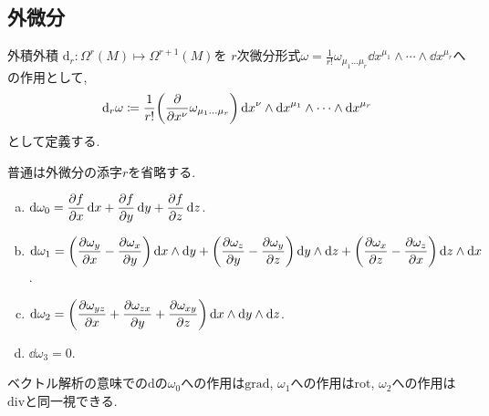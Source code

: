 \documentclass[../main.tex]{subfiles}
\begin{document}
\subsection{外微分}
    \begin{dfn}{外積}{外積}
        $\mathrm{d}_r:\Omega^r(M)\mapsto\Omega^{r+1}(M)$を
        $r$次微分形式$\displaystyle \omega = \frac{1}{r!}\omega_{\mu_1\ldots\mu_r}\dd{x}^{\mu_1} \wedge \cdots \wedge \dd{x}^{\mu_r}$への作用として,
        \begin{equation}
            \mathrm{d}_r\omega \coloneqq \frac{1}{r!}
                \qty(\pdv{x^\nu}\omega_{\mu_1\ldots\mu_r})
                    \dd{x}^\nu \wedge \dd{x}^{\mu_1} \wedge
                        \cdots \wedge \dd{x}^{\mu_r}
        \end{equation}
        として定義する.
    \end{dfn}
    普通は外微分の添字$r$を省略する.

    \begin{exm}{}{}
        \begin{enumerate}[(a)]
            \item $\displaystyle
                \dd{\omega_0}
                    = \pdv{f}{x}\dd{x} + \pdv{f}{y}\dd{y} + \pdv{f}{z}\dd{z}$.
            \item \small $\displaystyle
                \dd{\omega_1}
                    = \qty(\pdv{\omega_y}{x}-\pdv{\omega_x}{y})
                            \dd{x} \wedge \dd{y}
                    + \qty(\pdv{\omega_z}{y}-\pdv{\omega_y}{z})
                            \dd{y} \wedge \dd{z}
                    + \qty(\pdv{\omega_x}{z}-\pdv{\omega_z}{x})
                            \dd{z} \wedge \dd{x}$. \normalsize
            \item $\displaystyle
                \dd{\omega_2}
                    = \qty(\pdv{\omega_{yz}}{x} + \pdv{\omega_{zx}}{y}
                            + \pdv{\omega_{xy}}{z})
                                \dd{x} \wedge \dd{y} \wedge \dd{z}$.
            \item $\dd{\omega_3} = 0$.
        \end{enumerate}
    \end{exm}
    ベクトル解析の意味での$\mathrm{d}$の$\omega_0$への作用は$\mathrm{grad}$, $\omega_1$への作用は$\mathrm{rot}$, $\omega_2$への作用は$\mathrm{div}$と同一視できる.
\end{document}
